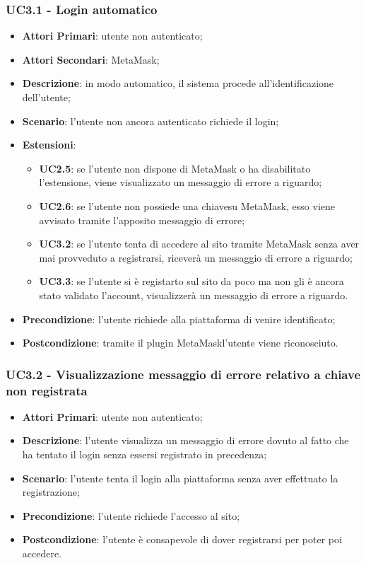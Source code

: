 \subsubsection{UC3.1 - Login automatico}
\begin{itemize}
	\item \textbf{Attori Primari}:
	utente non autenticato;
	\item \textbf{Attori Secondari}:
	MetaMask\glo;
	\item \textbf{Descrizione}:
	in modo automatico, il sistema procede all'identificazione dell'utente;
	\item \textbf{Scenario}:
	l'utente non ancora autenticato richiede il login;
	\item \textbf{Estensioni}:
	\begin{itemize}
		\item \textbf{UC2.5}: se l'utente non dispone di MetaMask o ha disabilitato l'estensione, viene visualizzato un messaggio di errore a riguardo;
		\item \textbf{UC2.6}: se l'utente non possiede una chiave\glosp su MetaMask\glo, esso viene avvisato tramite l'apposito messaggio di errore;
		\item \textbf{UC3.2}: se l'utente tenta di accedere al sito tramite MetaMask senza aver mai provveduto a registrarsi, riceverà un messaggio di errore a riguardo;
		\item \textbf{UC3.3}: se l'utente si è registarto sul sito da poco ma non gli è ancora stato validato l'account, visualizzerà un messaggio di errore a riguardo.
	\end{itemize}
	\item \textbf{Precondizione}:
	l'utente richiede alla piattaforma di venire identificato;
	\item \textbf{Postcondizione}:
	tramite il plugin MetaMask\glo l'utente viene riconosciuto.
\end{itemize}
\subsubsection{UC3.2 - Visualizzazione messaggio di errore relativo a chiave non registrata}
\begin{itemize}
	\item \textbf{Attori Primari}:
	utente non autenticato;
	\item \textbf{Descrizione}:
	l'utente visualizza un messaggio di errore dovuto al fatto che ha tentato il login senza essersi registrato in precedenza;
	\item \textbf{Scenario}:
	l'utente tenta il login alla piattaforma senza aver effettuato la registrazione;
	\item \textbf{Precondizione}:
	l'utente richiede l'accesso al sito;
	\item \textbf{Postcondizione}:
	l'utente è consapevole di dover registrarsi per poter poi accedere.
\end{itemize}
